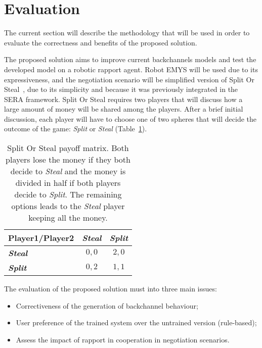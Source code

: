 \section{Evaluation}
\label{sec:Evaluation}
The current section will describe the methodology that will be used in order to evaluate the correctness and benefits of the proposed solution. 

The proposed solution aims to improve current backchannels models and test the developed model on a robotic rapport agent. Robot \ac{EMYS} will be used due to its expressiveness, and the negotiation scenario will be simplified version of Split Or Steal~\cite{VandenAssem2012}, due to its simplicity and because it was previously integrated in the \ac{SERA} framework. Split Or Steal requires two players that will discuss how a large amount of money will be shared among the players. After a brief initial discussion, each player will have to choose one of two spheres that will decide the outcome of the game: \textit{Split} or \textit{Steal} (Table~\ref{fig:splitOrSteal}).

\begin{table}[]
	\centering
	\begin{tabular}{|l|c|c|}
		\hline
		\textbf{Player1/Player2} & 
		\textbf{\textit{Steal}} & \textbf{\textit{Split}} \\ \hline
		\textbf{\textit{Steal}} & $0,0$ & $2,0$		\\ \hline
		\textbf{\textit{Split}} & $0,2$ & $1,1$      \\ \hline
	\end{tabular}
	\caption{Split Or Steal payoff matrix. Both players lose the money if they both decide to \textit{Steal} and the money is divided in half if both players decide to \textit{Split}. The remaining options leads to the \textit{Steal} player keeping all the money.}
	\label{fig:splitOrSteal}
\end{table}

\vspace{-8mm}

The evaluation of the proposed solution must into three main issues:
\begin{itemize}
	\item Correctiveness of the generation of backchannel behaviour;
	\item User preference of the trained system over the untrained version (rule-based);
	\item Assess the impact of rapport in cooperation in negotiation scenarios.
\end{itemize}

